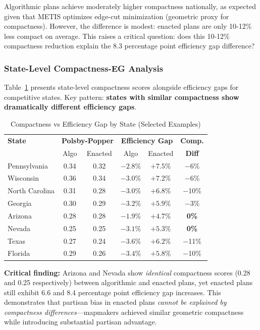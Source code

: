 Algorithmic plans achieve moderately higher compactness nationally, as expected given that METIS optimizes edge-cut minimization (geometric proxy for compactness). However, the difference is modest: enacted plans are only 10-12\% less compact on average. This raises a critical question: does this 10-12\% compactness reduction explain the 8.3 percentage point efficiency gap difference?

\subsubsection{State-Level Compactness-EG Analysis}

Table~\ref{tab:compactness-eg} presents state-level compactness scores alongside efficiency gaps for competitive states. Key pattern: \textbf{states with similar compactness show dramatically different efficiency gaps}.

\begin{table}[h]
\centering
\caption{Compactness vs Efficiency Gap by State (Selected Examples)}
\label{tab:compactness-eg}
\small
\begin{tabular}{lccccc}
\toprule
\textbf{State} & \multicolumn{2}{c}{\textbf{Polsby-Popper}} & \multicolumn{2}{c}{\textbf{Efficiency Gap}} & \textbf{Comp.} \\
 & Algo & Enacted & Algo & Enacted & \textbf{Diff} \\
\midrule
Pennsylvania & 0.34 & 0.32 & $-2.8\%$ & $+7.5\%$ & $-$6\% \\
Wisconsin & 0.36 & 0.34 & $-3.0\%$ & $+7.2\%$ & $-$6\% \\
North Carolina & 0.31 & 0.28 & $-3.0\%$ & $+6.8\%$ & $-$10\% \\
\midrule
Georgia & 0.30 & 0.29 & $-3.2\%$ & $+5.9\%$ & $-$3\% \\
Arizona & 0.28 & 0.28 & $-1.9\%$ & $+4.7\%$ & \textbf{0\%} \\
Nevada & 0.25 & 0.25 & $-3.1\%$ & $+5.3\%$ & \textbf{0\%} \\
\midrule
Texas & 0.27 & 0.24 & $-3.6\%$ & $+6.2\%$ & $-$11\% \\
Florida & 0.29 & 0.26 & $-3.4\%$ & $+5.8\%$ & $-$10\% \\
\bottomrule
\end{tabular}
\end{table}

\textbf{Critical finding:} Arizona and Nevada show \emph{identical} compactness scores (0.28 and 0.25 respectively) between algorithmic and enacted plans, yet enacted plans still exhibit 6.6 and 8.4 percentage point efficiency gap increases. This demonstrates that partisan bias in enacted plans \emph{cannot be explained by compactness differences}---mapmakers achieved similar geometric compactness while introducing substantial partisan advantage.

